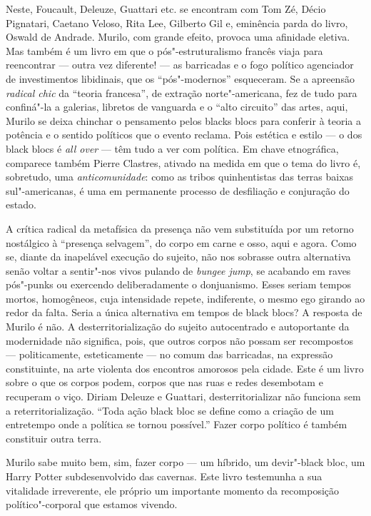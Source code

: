Neste, Foucault, Deleuze, Guattari etc. se encontram com Tom Zé,
Décio Pignatari, Caetano Veloso, Rita Lee, Gilberto Gil e, eminência
parda do livro, Oswald de Andrade. Murilo, com grande efeito, provoca
uma afinidade eletiva. Mas também é um livro em que o pós"-estruturalismo
francês viaja para reencontrar --- outra vez diferente! --- as barricadas
e o fogo político agenciador de investimentos libidinais, que os
``pós"-modernos'' esqueceram. Se a apreensão \emph{radical chic} da
``teoria francesa'', de extração norte"-americana, fez de tudo para
confiná"-la a galerias, libretos de vanguarda e o ``alto circuito'' das
artes, aqui, Murilo se deixa chinchar o pensamento pelos blacks blocs
para conferir à teoria a potência e o sentido políticos que o evento
reclama. Pois estética e estilo --- o dos black blocs é \emph{all over}
--- têm tudo a ver com política. Em chave etnográfica, comparece também
Pierre Clastres, ativado na medida em que o tema do livro é, sobretudo,
uma \emph{anticomunidade}: como as tribos quinhentistas das terras
baixas sul"-americanas, é uma em permanente processo de desfiliação e
conjuração do estado.

A crítica radical da metafísica da presença não vem substituída por um
retorno nostálgico à ``presença selvagem'', do corpo em carne e osso,
aqui e agora. Como se, diante da inapelável execução do sujeito, não nos
sobrasse outra alternativa senão voltar a sentir"-nos vivos pulando de
\emph{bungee jump}, se acabando em raves pós"-punks ou exercendo
deliberadamente o donjuanismo. Esses seriam tempos mortos, homogêneos,
cuja intensidade repete, indiferente, o mesmo ego girando ao redor da
falta. Seria a única alternativa em tempos de black blocs? A resposta de
Murilo é não. A desterritorialização do sujeito autocentrado e
autoportante da modernidade não significa, pois, que outros corpos
não possam ser recompostos --- politicamente, esteticamente --- no comum
das barricadas, na expressão constituinte, na arte violenta dos
encontros amorosos pela cidade. Este é um livro sobre o que os corpos
podem, corpos que nas ruas e redes desembotam e recuperam o viço. Diriam
Deleuze e Guattari, desterritorializar não funciona sem a
reterritorialização. ``Toda ação black bloc se define como a criação de
um entretempo onde a política se tornou possível.'' Fazer corpo político
é também constituir outra terra.

Murilo sabe muito bem, sim, fazer corpo --- um híbrido, um devir"-black
bloc, um Harry Potter subdesenvolvido das cavernas. Este livro
testemunha a sua vitalidade irreverente, ele próprio um importante
momento da recomposição político"-corporal que estamos vivendo.




